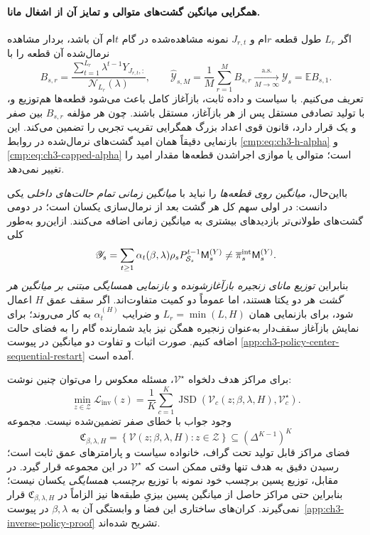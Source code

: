 \paragraph{همگرایی میانگین گشت‌های متوالی و تمایز آن از اشغال مانا.}
اگر $L_r$ طول قطعه $r$ام و
$J_{r,t}$ نمونه مشاهده‌شده
در گام $t$ام آن باشد،
بردار مشاهده نرمال‌شده
آن قطعه را با
\begin{equation}\label{cmp:eq:ch3-sequential-episode-average}
\boxed{
B_{s,r}=
\frac{\sum_{t=1}^{L_r}
\lambda^{t-1}Y_{J_{r,t},:}}
{\mathcal N_{L_r}(\lambda)},
\qquad
\widehat{\mathscr Y}_{s,M}
=\frac1M\sum_{r=1}^{M}B_{s,r}
\xrightarrow[M\to\infty]{\mathrm{a.s.}}
\mathscr Y_s=\mathbb E B_{s,1}.
}
\end{equation}
تعریف می‌کنیم.
با سیاست و داده ثابت،
بازآغاز کامل باعث می‌شود
قطعه‌ها هم‌توزیع و،
با تولید تصادفی مستقل
پس از هر بازآغاز،
مستقل باشند.
چون هر مؤلفه $B_{s,r}$
بین صفر و یک قرار دارد،
قانون قوی اعداد بزرگ
همگرایی تقریب تجربی
را تضمین می‌کند.
این بازنمایی دقیقاً همان
امید گشت‌های نرمال‌شده
در روابط
\eqref{cmp:eq:ch3-h-alpha}
و \eqref{cmp:eq:ch3-capped-alpha}
است؛ متوالی یا موازی
اجراشدن قطعه‌ها
مقدار امید را تغییر
نمی‌دهد.

بااین‌حال، \emph{میانگین
روی قطعه‌ها} را
نباید با \emph{میانگین
زمانی تمام حالت‌های
داخلی} یکی دانست:
در اولی سهم کل هر
گشت بعد از نرمال‌سازی
یکسان است؛ در دومی
گشت‌های طولانی‌تر
بازدیدهای بیشتری
به میانگین زمانی
اضافه می‌کنند.
ازاین‌رو به‌طور کلی
\[
\mathscr Y_s
=\sum_{t\ge1}\alpha_t(\beta,\lambda)
\rho_sP_{\mathcal S_s}^{t-1}\mathsf M_s^{(Y)}
\ne
\overline\pi_s^{\rm int}\mathsf M_s^{(Y)}.
\]
بنابراین \emph{توزیع
مانای زنجیره بازآغازشونده}
و \emph{بازنمایی همسایگی
مبتنی بر میانگین هر گشت}
هر دو یکتا هستند،
اما عموماً دو کمیت
متفاوت‌اند. اگر
سقف عمق $H$ اعمال شود،
برای بازنمایی همان
$L_r=\min(L,H)$ و
ضرایب $\alpha_t^{(H)}$
به کار می‌روند؛
برای نمایش بازآغاز
سقف‌دار به‌عنوان
زنجیره همگن نیز
باید شمارنده گام
را به فضای حالت
اضافه کنیم.
صورت اثبات و
تفاوت دو میانگین
در پیوست
\ref{app:ch3-policy-center-sequential-restart}
آمده است.


برای مراکز هدف دلخواه $\mathcal V^\star$، مسئله معکوس را می‌توان چنین نوشت:
\begin{equation}\label{cmp:eq:ch3-center-inverse-loss}
\boxed{\min_{z\in\mathcal Z}
\mathcal L_{\mathrm{inv}}(z)=
\frac1K\sum_{c=1}^{K}
\operatorname{JSD}\!\left(
\mathcal V_c(z;\beta,\lambda,H),\mathcal V_c^\star
\right).}
\end{equation}
وجود جواب با خطای صفر تضمین‌شده نیست. مجموعه
\begin{equation}\label{cmp:eq:ch3-attainable-centers}
\mathfrak C_{\beta,\lambda,H}
=\left\{\mathcal V(z;\beta,\lambda,H):z\in\mathcal Z\right\}
\subseteq(\Delta^{K-1})^K
\end{equation}
فضای مراکز قابل تولید تحت گراف، خانواده سیاست و پارامترهای عمق ثابت است؛ رسیدن دقیق به هدف تنها وقتی ممکن است که $\mathcal V^\star$ در این مجموعه قرار گیرد. در مقابل، توزیع پسین برچسب خود نمونه با توزیع \emph{برچسب همسایگی} یکسان نیست؛ بنابراین حتی مراکز حاصل از میانگین پسین بیزیِ طبقه‌ها نیز الزاماً در $\mathfrak C_{\beta,\lambda,H}$ قرار نمی‌گیرند. کران‌های ساختاری این فضا و وابستگی آن به $\beta,\lambda$ در پیوست~\ref{app:ch3-inverse-policy-proof} تشریح شده‌اند.




